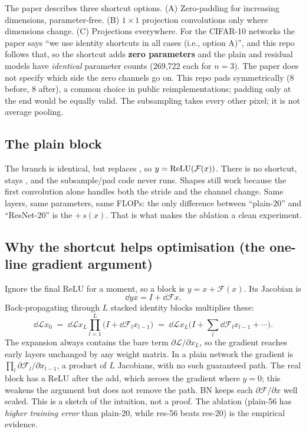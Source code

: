 \begin{warn}
The paper describes three shortcut options. (A) Zero-padding for increasing dimensions, parameter-free. (B) $1{\times}1$ projection convolutions only where dimensions change. (C) Projections everywhere. For the CIFAR-10 networks the paper says ``we use identity shortcuts in all cases (i.e., option A)'', and this repo follows that, so the shortcut adds \textbf{zero parameters} and the plain and residual models have \emph{identical} parameter counts (269{,}722 each for $n=3$). The paper does not specify which side the zero channels go on. This repo pads symmetrically (8 before, 8 after), a common choice in public reimplementations; padding only at the end would be equally valid. The subsampling takes every other pixel; it is not average pooling.
\end{warn}

\subsection{The plain block}

\begin{repo}[\texttt{residual=False}, used by \texttt{--plain}]
The branch is identical, but  replaces , so $y=\operatorname{ReLU}(\mathcal F(x))$. There is no shortcut,  stays , and the subsample/pad code never runs. Shapes still work because the first convolution alone handles both the stride and the channel change. Same layers, same parameters, same FLOPs: the only difference between ``plain-20'' and ``ResNet-20'' is the $+\,s(x)$. That is what makes the ablation a clean experiment.
\end{repo}

\subsection{Why the shortcut helps optimisation (the one-line gradient argument)}
\label{sec:whyres}

\begin{idea}
Ignore the final ReLU for a moment, so a block is $y = x + \mathcal F(x)$. Its Jacobian is
\[
  \dd{y}{x} = I + \dd{\mathcal F}{x}.
\]
Back-propagating through $L$ stacked identity blocks multiplies these:
\[
  \dd{\mathcal L}{x_0} \;=\; \dd{\mathcal L}{x_L}\prod_{l=1}^{L}\Big(I + \dd{\mathcal F_l}{x_{l-1}}\Big)
  \;=\; \dd{\mathcal L}{x_L}\Big(I + \sum_l \dd{\mathcal F_l}{x_{l-1}} + \cdots\Big).
\]
The expansion always contains the bare term $\partial\mathcal L/\partial x_L$, so the gradient reaches early layers unchanged by any weight matrix. In a plain network the gradient is $\prod_l \partial\mathcal F_l/\partial x_{l-1}$, a product of $L$ Jacobians, with no such guaranteed path. The real block has a ReLU after the add, which zeroes the gradient where $y=0$; this weakens the argument but does not remove the path. BN keeps each $\partial\mathcal F/\partial x$ well scaled. This is a sketch of the intuition, not a proof. The ablation (plain-56 has \emph{higher training error} than plain-20, while res-56 beats res-20) is the empirical evidence.
\end{idea}

